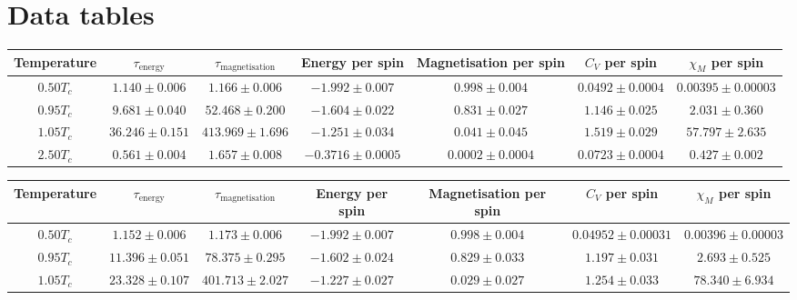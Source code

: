 \chapter*{Data tables}

\begin{sidewaystable}[h!]
    \centering
    \begin{tabular}{|c|c|c|c|c|c|c|}
        \hline
        Temperature & 
        $\tau_\text{energy}$ & 
        $\tau_\text{magnetisation}$ & 
        Energy per spin & 
        Magnetisation per spin & 
        $C_V$ per spin & 
        $\chi_M$ per spin \\ 
        \hline
        $0.50 T_c$ & $1.140 \pm 0.006$ & $1.166 \pm 0.006$ & $-1.992 \pm 0.007$ & $0.998 \pm 0.004$ & $0.0492 \pm 0.0004$ & $0.00395 \pm 0.00003$ \\
        \hline
        $0.95 T_c$ & $9.681 \pm 0.040$ & $52.468 \pm 0.200$ & $-1.604 \pm 0.022$ & $0.831 \pm 0.027$ & $1.146 \pm 0.025$ & $2.031 \pm 0.360$ \\
        \hline
        $1.05 T_c$ & $36.246 \pm 0.151$ & $413.969 \pm 1.696$ & $-1.251 \pm 0.034$ & $0.041 \pm 0.045$ & $1.519 \pm 0.029$ & $57.797 \pm 2.635$ \\
        \hline
        $2.50 T_c$ & $0.561 \pm 0.004$ & $1.657 \pm 0.008$ & $-0.3716 \pm 0.0005$ & $0.0002 \pm 0.0004$ & $0.0723 \pm 0.0004$ & $0.427 \pm 0.002$ \\
        \hline
    \end{tabular}
    \caption{Autocorrelation time and selected observables for the square lattice with side $L = 25$}
    \label{lec5:results_side25}
    \vspace{30pt}
    \centering
    \begin{tabular}{|c|c|c|c|c|c|c|}
        \hline
        Temperature & 
        $\tau_\text{energy}$ & 
        $\tau_\text{magnetisation}$ & 
        Energy per spin & 
        Magnetisation per spin & 
        $C_V$ per spin & 
        $\chi_M$ per spin \\ 
        \hline
        $0.50 T_c$ & $1.152 \pm 0.006$ & $1.173 \pm 0.006$ & $-1.992 \pm 0.007$ & $0.998 \pm 0.004$ & $0.04952 \pm 0.00031$ & $0.00396 \pm 0.00003$ \\
        \hline
        $0.95 T_c$ & $11.396 \pm 0.051$ & $78.375 \pm 0.295$ & $-1.602 \pm 0.024$ & $0.829 \pm 0.033$ & $1.197 \pm 0.031$ & $2.693 \pm 0.525$ \\
        \hline
        $1.05 T_c$ & $23.328 \pm 0.107$ & $401.713 \pm 2.027$ & $-1.227 \pm 0.027$ & $0.029 \pm 0.027$ & $1.254 \pm 0.033$ & $78.340 \pm 6.934$ \\

\end{tabular}
\end{sidewaystable}
